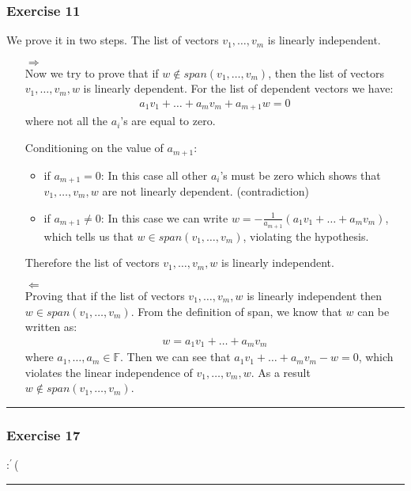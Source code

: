 \documentclass[12pt, letterpaper]{scrartcl}
\newcommand{\F}{\mathbb{F}}
\begin{document}
\subsubsection*{Exercise 11}
We prove it in two steps. The list of vectors $v_1,\dots, v_m$ is linearly independent.
\begin{itemize}
    \item[$\Longrightarrow$]\mbox{}\\
    Now we try to prove that if $w\notin span(v_1,\dots, v_m)$, then the list of vectors $v_1,\dots, v_m, w$ is linearly dependent. For the list of dependent vectors we have:
    \begin{align*}
        a_1v_1+\dots+a_mv_m+a_{m+1}w=0
    \end{align*}
    where not all the $a_i$'s are equal to zero.

    Conditioning on the value of $a_{m+1}$:
    \begin{itemize}
        \item if $a_{m+1}=0$: In this case all other $a_i$'s must be zero which shows that $v_1,\dots, v_m, w$ are not linearly dependent. (contradiction)
        \item if $a_{m+1}\neq0$: In this case we can write $w=-\frac{1}{a_{m+1}}(a_1v_1+\dots+a_mv_m)$, which tells us that $w\in span(v_1,\dots, v_m)$, violating the hypothesis.
    \end{itemize}
    Therefore the list of vectors $v_1,\dots, v_m, w$ is linearly independent.
    
    \item[$\Longleftarrow$]\mbox{}\\
    Proving that if the list of vectors $v_1,\dots, v_m, w$ is linearly independent then $w\in span(v_1,\dots, v_m)$. From the definition of span, we know that $w$ can be written as:
    \begin{align*}
        w = a_1v_1+\dots+a_mv_m
    \end{align*}
    where $a_1,\dots,a_m\in\F$. Then we can see that $a_1v_1+\dots+a_mv_m-w=0$, which violates the linear independence of $v_1,\dots, v_m, w$. As a result $w\notin span(v_1,\dots, v_m)$.
\end{itemize}
\vskip1mm\hrule
\subsubsection*{Exercise 17} 
$:^\prime$(
\vskip1mm\hrule
\end{document}
